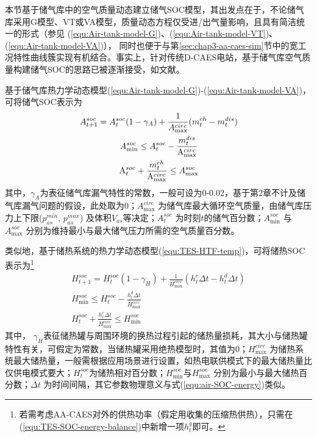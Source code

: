 本节基于储气库中的空气质量动态建立储气SOC模型，其出发点在于，不论储气库采用G模型、VT或VA模型，质量动态方程仅受进/出气量影响，且具有简洁统一的形式（参见
(\ref{equ:Air-tank-model-G})、(\ref{equ:Air-tank-model-VT})、(\ref{equ:Air-tank-model-VA})），%
同时也便于与第\ref{sec:chap3-aa-caes-sim}节中的宽工况特性曲线簇实现有机结合。事实上，针对传统D-CAES电站，基于储气库空气质量构建储气SOC的思路已被逐渐接受，如文献。

基于储气库热力学动态模型(\ref{equ:Air-tank-model-G})-(\ref{equ:Air-tank-model-VA})，可将储气SOC表示为\cite{CAES-Wind-Rui-19}
\begin{subequations}
\label{equ:air-SOC-energy}
\begin{gather}
A_{t + 1}^{soc} = A_t^{soc}(1-\gamma_{A}) + \frac{1}{{{A_{\max}^{circ}}}}({m_t^{ch} - m_t^{dis}})\label{equ:air-SOC-energy-balance}\\
A_{\min }^{soc} \le A_t^{soc} - \frac{{m_t^{dis}}}{{{{\rm{A}}_{\max }^{circ}}}}\\
{\rm{A}}_t^{soc} + \frac{{m_t^{ch}}}{{{{\rm{A}}_{\max }^{circ}}}} \le A_{\max }^{soc}
\end{gather}
\end{subequations}
其中，$\gamma_{A}$为表征储气库漏气特性的常数，一般可设为0-0.02，基于第2章不计及储气库漏气问题的假设，此处取为0；${A_{\max}^{circ}}$ 为储气库最大循环空气质量，由储气库压力上下限($p_{as}^{min}$, $p_{as}^{max}$) 及体积$V_{as}$等决定；${{A}}_t^{soc}$ 为时刻$t$的储气百分数；${{A}}_{\min }^{soc}$ 与 ${{A}}_{\max }^{soc}$ 分别为维持最小与最大储气压力所需的空气质量百分数。

类似地，基于储热系统的热力学动态模型(\ref{equ:TES-HTF-temp})，可将储热SOC表示为\footnote{若需考虑AA-CAES对外的供热功率（假定用收集的压缩热供热），只需在(\ref{equ:TES-SOC-energy-balance})中新增一项$h_t^{g}$即可。}\cite{CAES-Wind-Rui-19}
\begin{subequations}
\label{equ:TES-SOC-energy}
\begin{gather}
H_{t + 1}^{soc} = H_t^{soc}(1-\gamma_{H}) + \frac{1}{{{H_{\max}^{circ}}}}({h_t^c\Delta t - h_t^d\Delta t})\label{equ:TES-SOC-energy-balance}\\
H_{\min }^{soc} \le H_t^{soc} - \frac{{h_t^d\Delta t}}{{{H_{\max }^{circ}}}}\\
H_t^{soc} + \frac{{h_t^c\Delta t}}{{{H_{\max }^{circ}}}} \le H_{\min }^{soc}
\end{gather}
\end{subequations}
其中， $\gamma_{H}$表征储热罐与周围环境的换热过程引起的储热量损耗，其大小与储热罐特性有关，可假定为常数，当储热罐采用绝热模型时，其值为0；${H_{\max}^{circ}}$ 为储热系统最大储热量，一般需根据应用场景进行设置，如热电联供模式下的最大储热量比仅供电模式要大；$H_t^{soc}$为储热相对百分数；${{H}}_{\min }^{soc}$与${{H}}_{\max }^{soc}$ 分别为最小与最大储热百分数；$\Delta t$ 为时间间隔，其它参数物理意义与式(\ref{equ:air-SOC-energy})类似。

